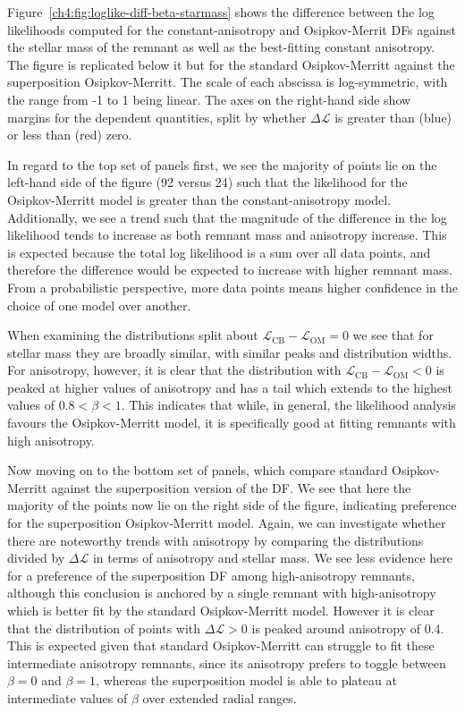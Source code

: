 Figure~\ref{ch4:fig:loglike-diff-beta-starmass} shows the difference between the log likelihoods computed for the constant-anisotropy and Osipkov-Merrit DFs against the stellar mass of the remnant as well as the best-fitting constant anisotropy. The figure is replicated below it but for the standard Osipkov-Merritt against the superposition Osipkov-Merritt. The scale of each abscissa is log-symmetric, with the range from -1 to 1 being linear. The axes on the right-hand side show margins for the dependent quantities, split by whether $\Delta \mathcal{L}$ is greater than (blue) or less than (red) zero.

In regard to the top set of panels first, we see the majority of points lie on the left-hand side of the figure (92 versus 24) such that the likelihood for the Osipkov-Merritt model is greater than the constant-anisotropy model. Additionally, we see a trend such that the magnitude of the difference in the log likelihood tends to increase as both remnant mass and anisotropy increase. This is expected because the total log likelihood is a sum over all data points, and therefore the difference would be expected to increase with higher remnant mass. From a probabilistic perspective, more data points means higher confidence in the choice of one model over another. 

When examining the distributions split about $\mathcal{L}_\mathrm{CB} - \mathcal{L}_\mathrm{OM} = 0$ we see that for stellar mass they are broadly similar, with similar peaks and distribution widths. For anisotropy, however, it is clear that the distribution with $\mathcal{L}_\mathrm{CB} - \mathcal{L}_\mathrm{OM} < 0$ is peaked at higher values of anisotropy and has a tail which extends to the highest values of $0.8 < \beta < 1$. This indicates that while, in general, the likelihood analysis favours the Osipkov-Merritt model, it is specifically good at fitting remnants with high anisotropy.

Now moving on to the bottom set of panels, which compare standard Osipkov-Merritt against the superposition version of the DF. We see that here the majority of the points now lie on the right side of the figure, indicating preference for the superposition Osipkov-Merritt model. Again, we can investigate whether there are noteworthy trends with anisotropy by comparing the distributions divided by $\Delta \mathcal{L}$ in terms of anisotropy and stellar mass. We see less evidence here for a preference of the superposition DF among high-anisotropy remnants, although this conclusion is anchored by a single remnant with high-anisotropy which is better fit by the standard Osipkov-Merritt model. However it is clear that the distribution of points with $\Delta \mathcal{L} > 0$ is peaked around anisotropy of 0.4. This is expected given that standard Osipkov-Merritt can struggle to fit these intermediate anisotropy remnants, since its anisotropy prefers to toggle between $\beta = 0$ and $\beta = 1$, whereas the superposition model is able to plateau at intermediate values of $\beta$ over extended radial ranges.

